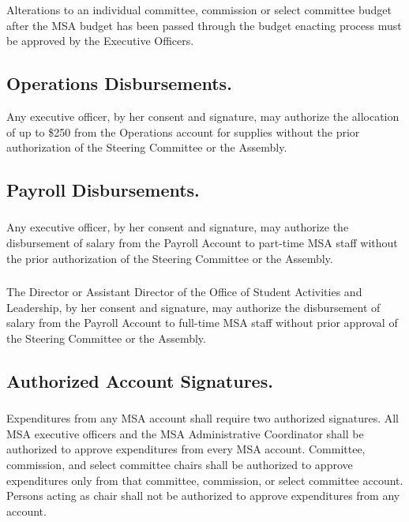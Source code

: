 \subsubsection{}
Alterations to an individual committee, commission or select committee budget after the MSA budget has been passed through the budget enacting process must be approved by the Executive Officers.

\subsection{Operations Disbursements.}
Any executive officer, by her consent and signature, may authorize the allocation of up to \$250 from the Operations account for supplies without the prior authorization of the Steering Committee or the Assembly.

\subsection{Payroll Disbursements.}
\subsubsection{}
Any executive officer, by her consent and signature, may authorize the disbursement of salary from the Payroll Account to part-time MSA staff without the prior authorization of the Steering Committee or the Assembly.  
\subsubsection{}
The Director or Assistant Director of the Office of Student Activities and Leadership, by her consent and signature, may authorize the disbursement of salary from the Payroll Account to full-time MSA staff without prior approval of the Steering Committee or the Assembly.

\subsection{Authorized Account Signatures.}
\subsubsection{}
Expenditures from any MSA account shall require two authorized signatures.  All MSA executive officers and the MSA Administrative Coordinator shall be authorized to approve expenditures from every MSA account.  Committee, commission, and select committee chairs shall be authorized to approve expenditures only from that committee, commission, or select committee account.  Persons acting as chair shall not be authorized to approve expenditures from any account.  
